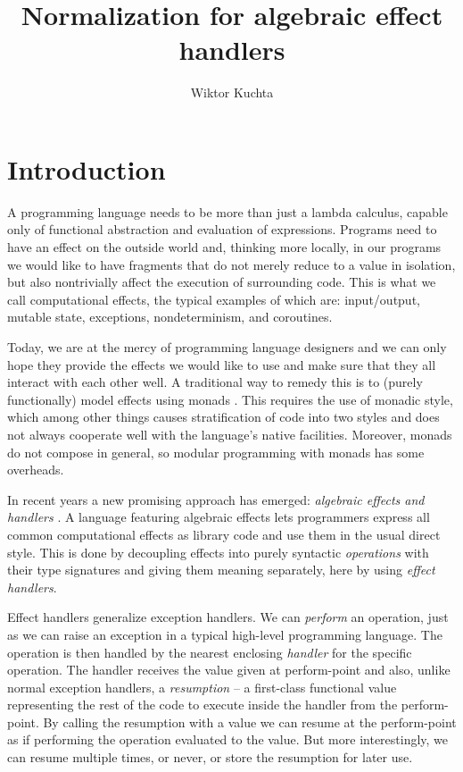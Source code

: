 \documentclass[a4paper, 11pt,titlepage, openright, twoside]{report}
\title{Normalization for algebraic effect handlers}
\author{Wiktor Kuchta}
\date{\vspace{-4ex}}
\newcommand{\+}{\enspace}
\begin{document}
\maketitle

\tableofcontents

\chapter{Introduction}
A programming language needs to be more than just a lambda calculus,
capable only of functional abstraction and evaluation of expressions.
Programs need to have an effect on the outside world and, thinking more locally,
in our programs we would like to have fragments that do not merely reduce to a value in isolation,
but also nontrivially affect the execution of surrounding code.
This is what we call computational effects, the typical examples of which are:
input/output, mutable state, exceptions, nondeterminism, and coroutines.

Today, we are at the mercy of programming language designers
and we can only hope they provide the
effects we would like to use and make sure that they all interact with
each other well.
A traditional way to remedy this is to (purely functionally) model effects using monads \cite{monads}.
This requires the use of monadic style, which among other things causes
stratification of code into two styles and does not always cooperate well with
the language's native facilities.
Moreover, monads do not compose in general, so modular programming with monads has some overheads.

In recent years a new promising approach has emerged: \textit{algebraic effects and handlers} \cite{Plotkin_2013}.
A language featuring algebraic effects lets programmers express all common computational effects as library code
and use them in the usual direct style.
This is done by decoupling effects into purely syntactic {\em operations} with their type signatures
and giving them meaning separately, here by using {\em effect handlers}.

Effect handlers generalize exception handlers.
We can \textit{perform} an operation,
just as we can raise an exception in a typical high-level programming language.
The operation is then handled by the nearest enclosing \textit{handler} for the specific operation.
The handler receives the value given at perform-point and also,
unlike normal exception handlers,
a \textit{resumption} – a first-class functional value representing the rest
of the code to execute inside the handler from the perform-point.
By calling the resumption with a value we can resume at the perform-point
as if performing the operation evaluated to the value.
But more interestingly, we can resume multiple times, or never, or store the resumption for later use.
\end{document}
